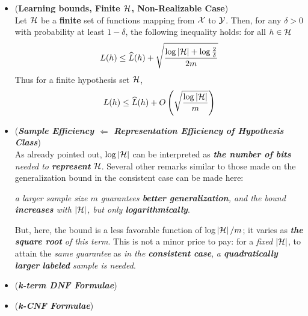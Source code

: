 \documentclass[11pt]{article}
\begin{document}
\begin{itemize}
\item \begin{proposition} (\textbf{Learning bounds, Finite ${\mathcal H}$, Non-Realizable Case}) \citep{mohri2018foundations}\\
Let ${\mathcal H}$ be a \textbf{finite} set of functions mapping from ${\mathcal X}$ to ${\mathcal Y}$.  Then, for any $\delta > 0$ with probability at least $1 - \delta$, the following inequality holds: for all $h \in {\mathcal H}$
\begin{align}
 L(h) \le  \widehat{L}(h) + \sqrt{\frac{\log\left\lvert {\mathcal H} \right\rvert + \log\frac{2}{\delta}}{2m}}  \label{eqn: pac_finite_case_consistency}
\end{align} Thus for a finite hypothesis set ${\mathcal H}$, 
\begin{align}
 L(h) \le  \widehat{L}(h) + O\left(\sqrt{\frac{\log\left\lvert {\mathcal H} \right\rvert}{m}}\right)  \label{eqn: pac_finite_case_consistency_bigO}
\end{align}
\end{proposition}

\item \begin{remark} (\emph{\textbf{Sample Efficiency $\Leftarrow$ Representation Efficiency of Hypothesis Class}})\\
As already pointed out, $\log\left\lvert {\mathcal H} \right\rvert$ can be interpreted as \emph{\textbf{the number of bits} needed to \textbf{represent} ${\mathcal H}$}. Several other remarks similar to those made on the generalization bound in the consistent case can be made here: 

\emph{a larger sample size $m$ guarantees \textbf{better generalization}, and the bound \textbf{increases} with $\left\lvert {\mathcal H} \right\rvert$, but only \textbf{logarithmically}}.

But, here, the bound is a less favorable function of $\log\left\lvert {\mathcal H} \right\rvert/m$; it varies as \emph{\textbf{the square root} of this term}. This is not a minor price to pay: for a \emph{fixed} $\left\lvert {\mathcal H} \right\rvert$, to attain the \emph{same guarantee} as \emph{in the \textbf{consistent case}}, \emph{a \textbf{quadratically larger} \textbf{labeled} sample is needed}.
\end{remark}



\item \begin{example}(\emph{\textbf{k-term DNF Formulae}})  \citep{mohri2018foundations}\\
\end{example}

\item \begin{example}(\emph{\textbf{k-CNF Formulae}})  \citep{mohri2018foundations}\\
\end{example}
\end{itemize}
\end{document}
